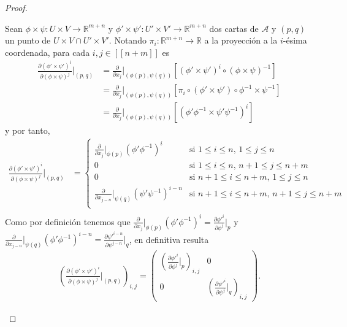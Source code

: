 \documentclass[11pt]{article}
\newcommand{\R}{\mathbb{R}}
\newcommand{\nat}[1]{[\![#1]\!]}
\begin{document}
\begin{proof}
\begin{itemize}[listparindent = \parindent]
Sean $\phi \times \psi : U \times V \to \R^{m+n}$ y $\phi' \times \psi': U' \times V' \to \R^{m+n}$ dos cartas de $\mathcal{A}$ y $(p,q)$ un punto de  $U \times V \cap U' \times V'$. Notando $\pi_i : \R^{m+n} \to \R$ a la proyección a la $i$-ésima coordenada, para cada $i,j \in \nat{n+m}$ es
\begin{align*}
\frac{\partial (\phi' \times \psi')^i}{\partial (\phi \times \psi)^j}\Big|_{(p,q)} &= \frac{\partial }{\partial x_j}\Big|_{(\phi(p),\psi(q))}[(\phi' \times \psi')^i \circ (\phi \times \psi)^{-1}]\\
&= \frac{\partial }{\partial x_j}\Big|_{(\phi(p),\psi(q))}[\pi_i \circ (\phi' \times \psi') \circ \phi^{-1} \times \psi^{-1}]\\
&= \frac{\partial }{\partial x_j}\Big|_{(\phi(p),\psi(q))}[(\phi'\phi^{-1} \times \psi'\psi^{-1})^i] 
\end{align*}
y por tanto,
\begin{align*}
\frac{\partial (\phi' \times \psi')^i}{\partial (\phi \times \psi)^j}\Big|_{(p,q)} &= \begin{cases}
\frac{\partial }{\partial x_j}|_{\phi(p)}(\phi'\phi^{-1})^i&\text{si $1 \leq i \leq n$, $1 \leq j \leq n$ }\\
0 &\text{si $1 \leq i \leq n$, $n+1 \leq j \leq n+m$ }\\
0 &\text{si $n+1 \leq i \leq n+m$, $1 \leq j \leq n$ }\\
\frac{\partial }{\partial x_{j-n}}|_{\psi(q)}(\psi'\psi^{-1})^{i-n}&\text{si $n+1 \leq i \leq n+m$, $n+1 \leq j \leq n+m$ }\\
\end{cases}\\
\end{align*}
Como por definición tenemos que $\frac{\partial }{\partial x_j}\Big|_{\phi(p)}(\phi'\phi^{-1})^i = \frac{\partial {\phi'}^i}{\partial \phi^j}\Big|_p$ y $\frac{\partial }{\partial x_{j-n}}\Big|_{\psi(q)}(\phi'\phi^{-1})^{i-n} = \frac{\partial {\psi'}^{i-n}}{\partial \psi^{j-n}}\Big|_q$, en definitiva resulta
\begin{align*}
\left(\frac{\partial (\phi' \times \psi')^i}{\partial (\phi \times \psi)^j}\Big|_{(p,q)}\right)_{i,j} = \begin{pmatrix}
\left(\frac{\partial {\phi'}^i}{\partial \phi^j}\Big|_p\right)_{i,j} & 0\\
0 & \left(\frac{\partial {\psi'}^{i}}{\partial \psi^{j}}\Big|_q\right)_{i,j}
\end{pmatrix}.
\end{align*}


\end{itemize}
\end{proof}
\end{document}
